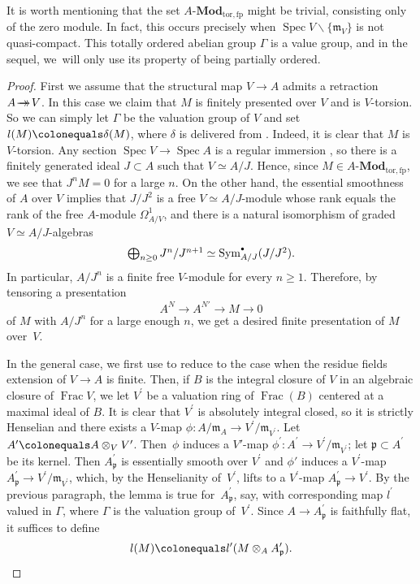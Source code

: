 \documentclass[JEP,XML,SOM,Unicode,published]{cedram}
\newcommand{\onto}{\mathchoice{\to\hspace*{-5mm}\to}{\to\hspace*{-2.85mm}\to}{\to\hspace*{-3mm}\to}{\to\hspace*{-3mm}\to}}
\newcommand{\sbullet}{{\scriptscriptstyle\bullet}}
\newcommand{\csbullet}{{\raisebox{1pt}{$\sbullet$}}}
\let\ts\textstyle
\let\backslash\smallsetminus
\newcommand{\GG}{\Gamma}
\newcommand{\fm}{\mathfrak{m}}
\let\ce\colonequals
\let\x\text
\newcommand{\pr}{^{\prime}}
\DeclareMathOperator{\Spec}{Spec}
\DeclareMathOperator{\Frac}{Frac}
\newcommand{\bpf}{\begin{proof}}
\newcommand{\epf}{\end{proof}}
\providecommand{\SP}[1]{\cite[\href{https://stacks.math.columbia.edu/tag/#1}{#1}]{SP}}
\theoremstyle{plain}
\theoremstyle{definition}
\begin{document}
{It is worth mentioning that the set $A\x{-}\mathbf{Mod}_{\mathrm{tor, fp}}$ might be trivial, consisting only of the zero module. In fact, this occurs precisely when $\Spec V\backslash \{\fm_V\}$ is not quasi-compact.
This totally ordered abelian group $\GG$ is a value group, and in the sequel, we~will only use its property of being partially ordered.}
\bpf
First we assume that the structural map $V\!\to\! A$ admits a retraction $A \!\onto\! V$. In this case we claim that $M$ is finitely presented over $V$ and is $V$-torsion. So we can simply let $\Gamma$ be the valuation group of $V$ and set $l(M)\ce \delta(M)$, where $\delta$ is delivered from .
Indeed, it is clear that $M$ is $V$-torsion.
Any section $\Spec V\to \Spec A$ is a regular immersion \SP{067R}, so there is a finitely generated ideal $J\subset A$ such that $V\simeq A/J$.
Hence, since $M\in A\x{-}\mathbf{Mod}_{\mathrm{tor, fp}}$, we see that $J^nM=0$ for a large $n$. On the other hand, the essential smoothness of $A$ over $V$ implies that $J/J^2$ is a free $V\simeq A/J$\nobreakdash-mod\-ule whose rank equals the rank of the free $A$\nobreakdash-mod\-ule $\Omega^1_{A/V}$, and there is a natural isomorphism of graded $V\simeq A/J$-algebras
\[
\ts \bigoplus_{n\ge 0} J^n/J^{n+1} \simeq \text{Sym}^{\csbullet}_{A/J}(J/J^2).
\]
In particular, $A/J^n$ is a finite free $V$\nobreakdash-mod\-ule for every $n\ge 1$.
Therefore, by tensoring a presentation
\[
A^N\to A^{N'} \to M\to 0
\]
of $M$ with $A/J^n$ for a large enough $n$, we get a desired finite presentation of $M$ over~$V$.

In the general case, we first use  to reduce to the case when the residue fields extension of $V\to A$ is finite. Then, if $B$ is the integral closure of $V$ in an algebraic closure of $\Frac V$, we let $V\pr$ be a valuation ring of $\Frac (B)$ centered at a maximal ideal of $B$. It is clear that $V\pr$ is absolutely integral closed, so it is strictly Henselian and there exists a $V$-map $\phi\colon A/\mathfrak{m}_{A}\to V\pr/\mathfrak{m}_{V\pr}$. Let $A\pr\ce A\otimes_VV\pr$. Then~$\phi$ induces a $V'$-map $\phi\pr \colon A\pr\to V\pr/\mathfrak{m}_{V\pr}$; let $\mathfrak{p}\subset A\pr$ be its kernel. Then $A\pr_{\mathfrak{p}}$ is essentially smooth over $V\pr$ and $\phi'$ induces a $V\pr$-map $A\pr_{\mathfrak{p}}\to V\pr/\mathfrak{m}_{V\pr}$, which, by the Henselianity of~$V\pr$, lifts to a $V\pr$-map $A\pr_{\mathfrak{p}}\!\to\! V\pr$. By the previous paragraph, the lemma is true for~$A\pr_{\mathfrak{p}}$, say, with corresponding map $l\pr$ valued in $\Gamma$, where $\Gamma$ is the valuation group of~$V\pr$. Since $A\to A\pr_{\mathfrak{p}}$ is faithfully flat, it suffices to define
\[
l(M)\ce l\pr(M\otimes_AA\pr_{\mathfrak{p}}). \qedhere
\]
\epf
\end{document}
